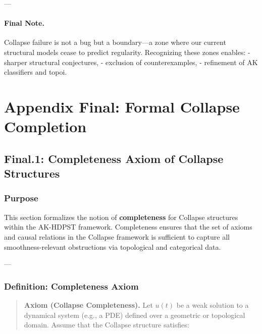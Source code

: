 \documentclass[11pt]{article}
\begin{document}
\begin{axiom}
\begin{axiom}
{{---

\paragraph{Final Note.}

Collapse failure is not a bug but a boundary—a zone where our current structural models cease to predict regularity.  
Recognizing these zones enables:
- sharper structural conjectures,
- exclusion of counterexamples,
- refinement of AK classifiers and topoi.






\section*{Appendix Final: Formal Collapse Completion}

\subsection*{Final.1: Completeness Axiom of Collapse Structures}

\subsubsection*{Purpose}

This section formalizes the notion of \textbf{completeness} for Collapse structures within the AK-HDPST framework.  
Completeness ensures that the set of axioms and causal relations in the Collapse framework is sufficient  
to capture all smoothness-relevant obstructions via topological and categorical data.

---

\subsubsection*{Definition: Completeness Axiom}

\begin{quote}
\textbf{Axiom (Collapse Completeness).}  
Let \( u(t) \) be a weak solution to a dynamical system (e.g., a PDE) defined over a geometric or topological domain.  
Assume that the Collapse structure satisfies:


\end{quote}}}
\end{axiom}
\end{axiom}
\end{document}
